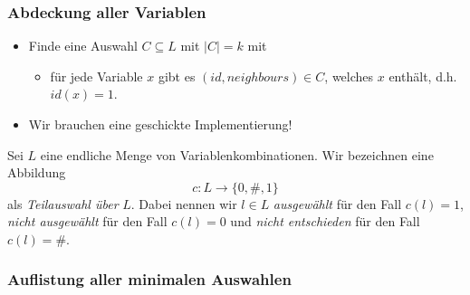 \documentclass[onlymath]{beamer}
\begin{document}
\begin{frame}
	\frametitle{Abdeckung aller Variablen}
	\begin{itemize}
		\item Finde eine Auswahl $C \subseteq L$ mit $|C| = k$ mit \pause
		\begin{itemize}
			\item für jede Variable $x$ gibt es $(id, neighbours) \in C$, welches $x$ enthält, d.h. $id(x) = 1$.
		\end{itemize}
	\item Wir brauchen eine geschickte Implementierung!
	\end{itemize} \pause
\begin{definition}
	Sei $L$ %
	eine endliche Menge von Variablenkombinationen. Wir bezeichnen eine Abbildung
	\begin{equation*}
	c : L \to \{0, \#, 1\}
	\end{equation*}
	als \emph{Teilauswahl über} $L$. \pause Dabei nennen wir $l \in L$ \textit{ausgewählt} für den Fall $c(l) = 1$, \textit{nicht ausgewählt} für den Fall $c(l) = 0$ und \textit{nicht entschieden} für den Fall $c(l) = \#$.
\end{definition}
\end{frame}

\begin{frame}
	\frametitle{Auflistung aller minimalen Auswahlen}
	\centering
\end{frame}
\end{document}
